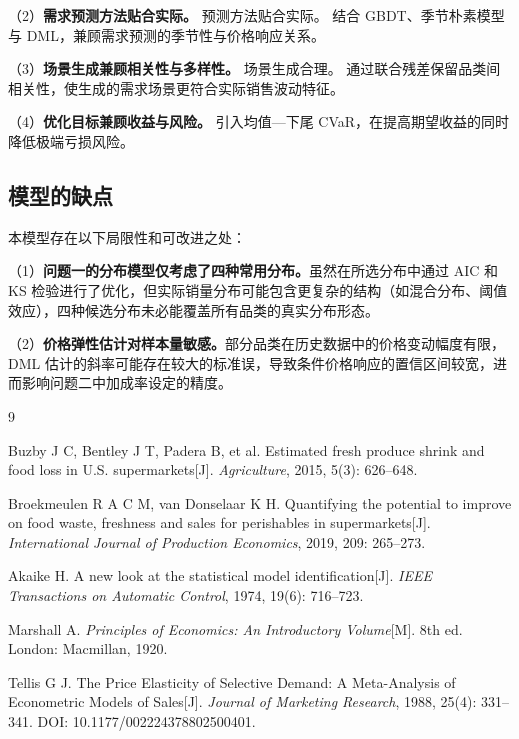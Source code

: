 \documentclass[withoutpreface,bwprint]{cumcmthesis} %
\numberwithin{equation}{section}
\begin{document}
（2）\textbf{需求预测方法贴合实际。}
预测方法贴合实际。 结合 GBDT、季节朴素模型与 DML，兼顾需求预测的季节性与价格响应关系。

（3）\textbf{场景生成兼顾相关性与多样性。}
场景生成合理。 通过联合残差保留品类间相关性，使生成的需求场景更符合实际销售波动特征。

（4）\textbf{优化目标兼顾收益与风险。}
引入均值—下尾 CVaR，在提高期望收益的同时降低极端亏损风险。

\subsection{模型的缺点}


本模型存在以下局限性和可改进之处：

（1）\textbf{问题一的分布模型仅考虑了四种常用分布。}虽然在所选分布中通过 AIC 和 KS 检验进行了优化，但实际销量分布可能包含更复杂的结构（如混合分布、阈值效应），四种候选分布未必能覆盖所有品类的真实分布形态。

（2）\textbf{价格弹性估计对样本量敏感。}部分品类在历史数据中的价格变动幅度有限，DML 估计的斜率可能存在较大的标准误，导致条件价格响应的置信区间较宽，进而影响问题二中加成率设定的精度。

\begin{thebibliography}{9}

Buzby J C, Bentley J T, Padera B, et al.
Estimated fresh produce shrink and food loss in U.S. supermarkets[J].
\textit{Agriculture},
2015, 5(3): 626--648.

Broekmeulen R A C M, van Donselaar K H.
Quantifying the potential to improve on food waste, freshness and sales for perishables in supermarkets[J].
\textit{International Journal of Production Economics},
2019, 209: 265--273.

Akaike H.
A new look at the statistical model identification[J].
\textit{IEEE Transactions on Automatic Control},
1974, 19(6): 716--723.


Marshall A.
\textit{Principles of Economics: An Introductory Volume}[M].
8th ed.
London: Macmillan, 1920.

Tellis G J.
The Price Elasticity of Selective Demand: A Meta-Analysis of Econometric Models of Sales[J].
\textit{Journal of Marketing Research}, 1988, 25(4): 331--341.
DOI: 10.1177/002224378802500401.


\end{thebibliography}
\end{document}
